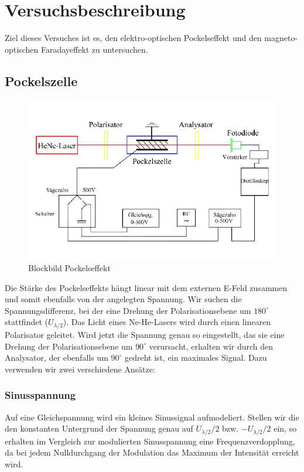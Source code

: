 \section{Versuchsbeschreibung}

Ziel dieses Versuches ist es, den elektro-optischen Pockelseffekt und den magneto-optischen Faradayeffekt zu untersuchen.
\subsection{Pockelszelle}

\begin{figure}[H]
 \centering
 \includegraphics[width=0.9\linewidth]{Bilder/blockbild-pockels.png}
 \caption{Blockbild Pockelseffekt}
\end{figure}

Die Stärke des Pockelseffekts hängt linear mit dem externen E-Feld zusammen und somit ebenfalls von der angelegten Spannung. Wir suchen die Spannungs\-differenz, bei der eine Drehung der Polarisationsebene um $180^{\circ}$ stattfindet ($U_{\lambda/2}$). Das Licht eines Ne-He-Lasers wird durch einen linearen Polarisator geleitet. Wird jetzt die Spannung genau so eingestellt, das sie eine Drehung der Polarisationsebene um $90^{\circ}$ verursacht, erhalten wir durch den Analysator, der ebenfalls um $90^{\circ}$ gedreht ist, ein maximales Signal. Dazu verwenden wir zwei verschiedene Ansätze:
\subsubsection{Sinusspannung}
Auf eine Gleichspannung wird ein kleines Sinussignal aufmodeliert. Stellen wir die den konstanten Untergrund der Spannung genau auf $U_{\lambda/2}/2$ bzw. $-U_{\lambda/2}/2$ ein, so erhalten im Vergleich zur modulierten Sinusspannung eine Frequenzverdopplung, da bei jedem Nulldurchgang der Modulation das Maximum der Intensität erreicht wird.
